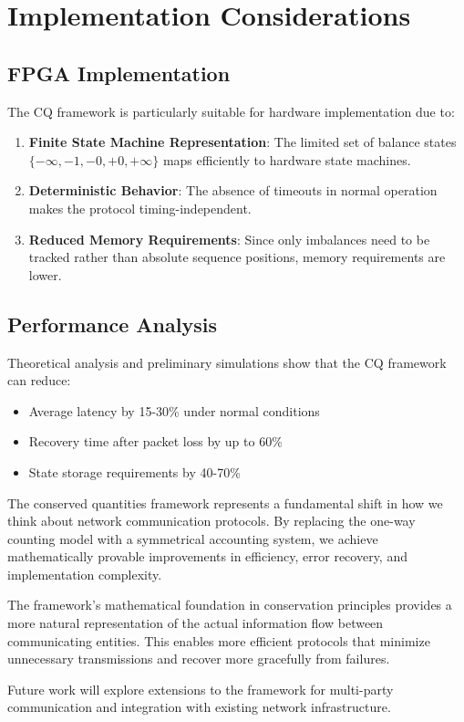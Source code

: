 \documentclass[../../../OAE-SPEC-MAIN.tex]{subfiles}
\begin{document}
\section{Implementation Considerations}

\subsection{FPGA Implementation}

The CQ framework is particularly suitable for hardware implementation due to:

\begin{enumerate}
    \item \textbf{Finite State Machine Representation}: The limited set of balance states $\{-\infty,-1,-0,+0,+\infty\}$ maps efficiently to hardware state machines.
    
    \item \textbf{Deterministic Behavior}: The absence of timeouts in normal operation makes the protocol timing-independent.
    
    \item \textbf{Reduced Memory Requirements}: Since only imbalances need to be tracked rather than absolute sequence positions, memory requirements are lower.
\end{enumerate}

\subsection{Performance Analysis}

Theoretical analysis and preliminary simulations show that the CQ framework can reduce:

\begin{itemize}
    \item Average latency by 15-30\% under normal conditions
    \item Recovery time after packet loss by up to 60\%
    \item State storage requirements by 40-70\%
\end{itemize}

The conserved quantities framework represents a fundamental shift in how we think about network communication protocols. By replacing the one-way counting model with a symmetrical accounting system, we achieve mathematically provable improvements in efficiency, error recovery, and implementation complexity.

The framework's mathematical foundation in conservation principles provides a more natural representation of the actual information flow between communicating entities. This enables more efficient protocols that minimize unnecessary transmissions and recover more gracefully from failures.

Future work will explore extensions to the framework for multi-party communication and integration with existing network infrastructure.
\end{document}
